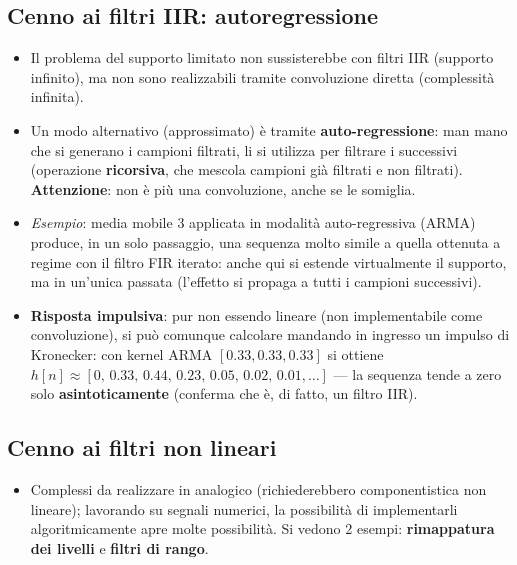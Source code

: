 \documentclass[12pt, a4paper]{article}
\begin{document}
\subsection{Cenno ai filtri IIR: autoregressione}
\begin{itemize}
    \item Il problema del supporto limitato non sussisterebbe con filtri IIR (supporto infinito), ma non sono realizzabili tramite convoluzione diretta (complessità infinita).
    \item Un modo alternativo (approssimato) è tramite \textbf{auto-regressione}: man mano che si generano i campioni filtrati, li si utilizza per filtrare i successivi (operazione \textbf{ricorsiva}, che mescola campioni già filtrati e non filtrati). \textbf{Attenzione}: non è più una convoluzione, anche se le somiglia.
    \item \textit{Esempio}: media mobile 3 applicata in modalità auto-regressiva (ARMA) produce, in un solo passaggio, una sequenza molto simile a quella ottenuta a regime con il filtro FIR iterato: anche qui si estende virtualmente il supporto, ma in un'unica passata (l'effetto si propaga a tutti i campioni successivi).
    \item \textbf{Risposta impulsiva}: pur non essendo lineare (non implementabile come convoluzione), si può comunque calcolare mandando in ingresso un impulso di Kronecker: con kernel ARMA $[0.33,0.33,0.33]$ si ottiene $h[n]\approx[0,\,0.33,\,0.44,\,0.23,\,0.05,\,0.02,\,0.01,\dots]$ — la sequenza tende a zero solo \textbf{asintoticamente} (conferma che è, di fatto, un filtro IIR).
\end{itemize}

\subsection{Cenno ai filtri non lineari}
\begin{itemize}
    \item Complessi da realizzare in analogico (richiederebbero componentistica non lineare); lavorando su segnali numerici, la possibilità di implementarli algoritmicamente apre molte possibilità. Si vedono 2 esempi: \textbf{rimappatura dei livelli} e \textbf{filtri di rango}.
\end{itemize}
\end{document}
